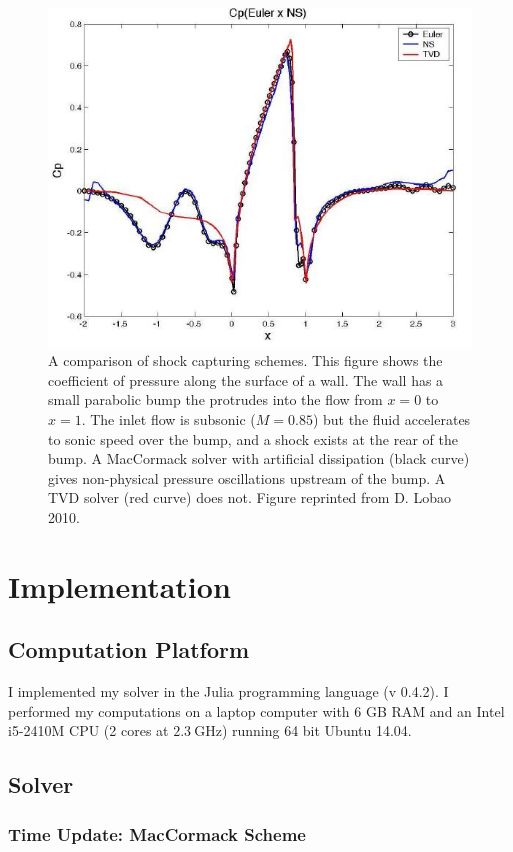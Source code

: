 \documentclass[paper=a4, fontsize=11pt]{scrartcl}
\numberwithin{equation}{section}        %
\numberwithin{figure}{section}          %
\numberwithin{table}{section}               %
\begin{document}
\begin{figure}[H]
    \centering
    \includegraphics[width = 0.8 \textwidth]{figures/lobao_mc_tvd.png}
    \caption{A comparison of shock capturing schemes. This figure shows the coefficient of pressure along the surface of a wall. The wall has a small parabolic bump the protrudes into the flow from $x = 0$ to $x = 1$. The inlet flow is subsonic ($M= 0.85$) but the fluid accelerates to sonic speed over the bump, and a shock exists at the rear of the bump. A MacCormack solver with artificial dissipation (black curve) gives non-physical pressure oscillations upstream of the bump. A TVD solver (red curve) does not. Figure reprinted from D. Lobao 2010.}
    \label{fig:lobao_mc_tvd}
\end{figure}


\section{Implementation}
\subsection{Computation Platform}
I implemented my solver in the Julia programming language (v 0.4.2). I performed my computations on a laptop computer with 6 GB RAM and an Intel i5-2410M CPU (2 cores at $\SI{2.3}{\giga\hertz}$) running 64 bit Ubuntu 14.04.

\subsection{Solver}
\subsubsection{Time Update: MacCormack Scheme}
\end{document}
